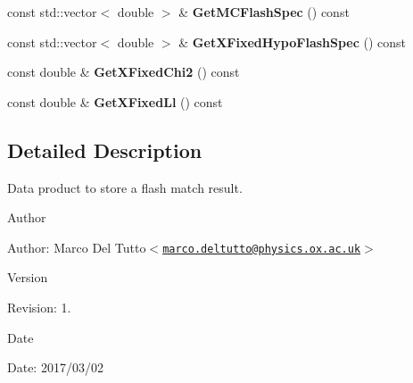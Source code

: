 \begin{DoxyCompactItemize}
\item 
\hypertarget{classubana_1_1FlashMatch_ad55287aa6f9ea080a5c875ea60090ae3}{const std\-::vector$<$ double $>$ \& {\bfseries \-Get\-M\-C\-Flash\-Spec} () const }\label{classubana_1_1FlashMatch_ad55287aa6f9ea080a5c875ea60090ae3}

\item 
\hypertarget{classubana_1_1FlashMatch_ad674b8ab8efe7f7850cdb5d689429907}{const std\-::vector$<$ double $>$ \& {\bfseries \-Get\-X\-Fixed\-Hypo\-Flash\-Spec} () const }\label{classubana_1_1FlashMatch_ad674b8ab8efe7f7850cdb5d689429907}

\item 
\hypertarget{classubana_1_1FlashMatch_a547468a6f20b51582c63bee251e327bd}{const double \& {\bfseries \-Get\-X\-Fixed\-Chi2} () const }\label{classubana_1_1FlashMatch_a547468a6f20b51582c63bee251e327bd}

\item 
\hypertarget{classubana_1_1FlashMatch_aced716901d42319db1d3054b31d22cc6}{const double \& {\bfseries \-Get\-X\-Fixed\-Ll} () const }\label{classubana_1_1FlashMatch_aced716901d42319db1d3054b31d22cc6}

\end{DoxyCompactItemize}


\subsection{\-Detailed \-Description}
\-Data product to store a flash match result. 

\begin{DoxyAuthor}{\-Author}

\end{DoxyAuthor}
\begin{DoxyParagraph}{\-Author\-:}
\-Marco \-Del \-Tutto$<$\href{mailto:marco.deltutto@physics.ox.ac.uk}{\tt marco.\-deltutto@physics.\-ox.\-ac.\-uk}$>$ 
\end{DoxyParagraph}


\begin{DoxyVersion}{\-Version}

\end{DoxyVersion}
\begin{DoxyParagraph}{\-Revision\-:}
1. 
\end{DoxyParagraph}


\begin{DoxyDate}{\-Date}

\end{DoxyDate}
\begin{DoxyParagraph}{\-Date\-:}
2017/03/02 
\end{DoxyParagraph}


